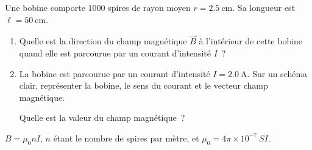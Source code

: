 Une bobine comporte 1000 spires de rayon moyen $r=\qty{2.5}{\cm}$. Sa longueur
est $\ell=\qty{50}{\cm}$.
\begin{enumerate}
    \item Quelle est la direction du champ magnétique $\vec{B}$ à l'intérieur de
          cette bobine quand elle est parcourue par un courant d'intensité $I$~?
    \item La bobine est parcourue par un courant d'intensité $I=\qty{2.0}{\A}$.
          Sur un schéma clair, représenter la bobine, le sens du courant et le
          vecteur champ magnétique.
    
          Quelle est la valeur du champ magnétique~?
\end{enumerate}
\begin{donnees}
    $B=\mu_{0}nI$, $n$ étant le nombre de spires par mètre, et
    $\mu_{0}=4\pi\times10^{-7}~\unit{SI}$.
\end{donnees}

